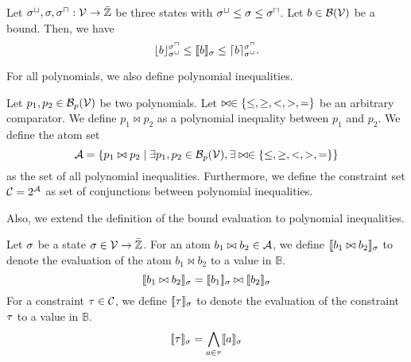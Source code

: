\begin{theorem}
  Let ${\sigma^\sqcup}, \sigma, {\sigma^\sqcap}: \mathcal{V} \rightarrow \bar{\mathbb{Z}}$ be three states with ${\sigma^\sqcup} \leq \sigma \leq {\sigma^\sqcap}$.
  Let $b \in \mathcal{B}(\mathcal{V})$ be a bound.
  Then, we have
  \[ \lfloor b \rfloor^{{\sigma^\sqcap}}_{{\sigma^\sqcup}} \leq \llbracket b \rrbracket_{\sigma} \leq \lceil b \rceil^{{\sigma^\sqcap}}_{{\sigma^\sqcup}}. \]
\end{theorem}
For all polynomials, we also define polynomial inequalities.

\begin{definition}
  Let $p_1, p_2 \in \mathcal{B}_p(\mathcal{V})$ be two polynomials.
  Let $\bowtie \in \lbrace \leq, \geq, <, >, = \rbrace$ be an arbitrary comparator.
  We define $p_1 \bowtie p_2$ as a polynomial inequality between $p_1$ and $p_2$.
  We define the atom set
  \[ \mathcal{A} = \lbrace p_1 \bowtie p_2 \mid \exists p_1, p_2 \in \mathcal{B}_p(\mathcal{V}), \exists \bowtie \in \lbrace \leq, \geq, <, >, = \rbrace \rbrace \]
  as the set of all polynomial inequalities.
  Furthermore, we define the constraint set $\mathcal{C} = 2^{\mathcal{A}}$ as set of conjunctions between polynomial inequalities.
\end{definition}
Also, we extend the definition of the bound evaluation to polynomial inequalities.

\begin{definition}
  Let $\sigma$ be a state $\sigma \in \mathcal{V} \rightarrow \bar{\mathbb{Z}}$.
  For an atom $b_1 \bowtie b_2 \in \mathcal{A}$, we define $\llbracket b_1 \bowtie b_2 \rrbracket_{\sigma}$ to denote the evaluation of the atom $b_1 \bowtie b_2$ to a value in $\mathbb{B}$.
  \[ \llbracket b_1 \bowtie b_2 \rrbracket_{\sigma} = \llbracket b_1 \rrbracket_{\sigma} \bowtie \llbracket b_2 \rrbracket_{\sigma} \]
  For a constraint $\tau \in \mathcal{C}$, we define $\llbracket \tau \rrbracket_{\sigma}$ to denote the evaluation of the constraint $\tau$ to a value in $\mathbb{B}$.
  \[ \llbracket \tau \rrbracket_{\sigma} = \bigwedge_{a \in \tau} \llbracket a \rrbracket_{\sigma} \]
\end{definition}
